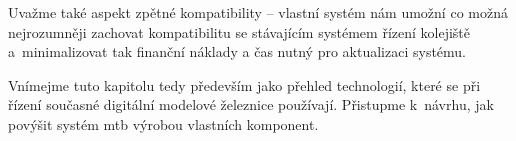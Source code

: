 Uvažme také aspekt zpětné kompatibility – vlastní systém nám umožní co možná
nejrozumněji zachovat kompatibilitu se stávajícím systémem řízení kolejiště
a~minimalizovat tak finanční náklady a čas nutný pro aktualizaci systému.

Vnímejme tuto kapitolu tedy především jako přehled technologií, které se
při řízení současné digitální modelové železnice používají. Přistupme k~návrhu,
jak povýšit systém \gls{mtb} výrobou vlastních komponent.
